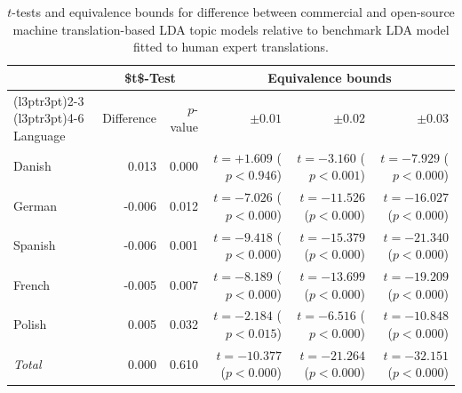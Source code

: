 \begin{table}[!t]

\caption{\label{tab:equivalence_input_similarity}$t$-tests and equivalence bounds for difference between commercial and open-source machine translation-based LDA topic models relative to benchmark LDA model fitted to human expert translations.}
\centering
\fontsize{10}{12}\selectfont
\begin{tabular}[t]{lrrrrr}
\toprule
\multicolumn{1}{c}{ } & \multicolumn{2}{c}{\$t\$-Test} & \multicolumn{3}{c}{Equivalence bounds} \\
\cmidrule(l{3pt}r{3pt}){2-3} \cmidrule(l{3pt}r{3pt}){4-6}
Language & Difference & $p$-value & $\pm 0.01$ & $\pm 0.02$ & $\pm 0.03$\\
\midrule
Danish & 0.013 & 0.000 & $t=+1.609$ ($p < 0.946$) & $t=-3.160$ ($p < 0.001$) & $t=-7.929$ ($p < 0.000$)\\
German & -0.006 & 0.012 & $t=-7.026$ ($p < 0.000$) & $t=-11.526$ ($p < 0.000$) & $t=-16.027$ ($p < 0.000$)\\
Spanish & -0.006 & 0.001 & $t=-9.418$ ($p < 0.000$) & $t=-15.379$ ($p < 0.000$) & $t=-21.340$ ($p < 0.000$)\\
French & -0.005 & 0.007 & $t=-8.189$ ($p < 0.000$) & $t=-13.699$ ($p < 0.000$) & $t=-19.209$ ($p < 0.000$)\\
Polish & 0.005 & 0.032 & $t=-2.184$ ($p < 0.015$) & $t=-6.516$ ($p < 0.000$) & $t=-10.848$ ($p < 0.000$)\\
\emph{Total} & 0.000 & 0.610 & $t=-10.377$ ($p < 0.000$) & $t=-21.264$ ($p < 0.000$) & $t=-32.151$ ($p < 0.000$)\\
\bottomrule
\end{tabular}
\end{table}
